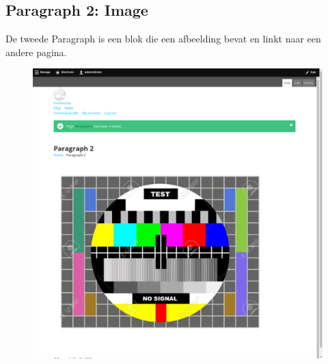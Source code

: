 \subsection{Paragraph 2: Image}
De tweede Paragraph is een blok die een afbeelding bevat en linkt naar een andere pagina.
\begin{figure}[h]
\includegraphics[width=1\textwidth]{img/p002.png}
\end{figure}

\clearpage
